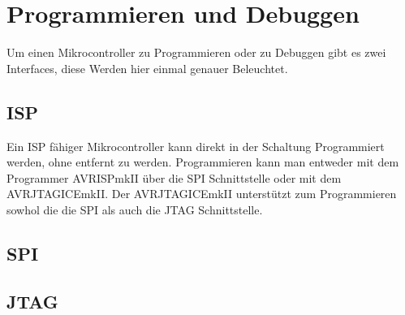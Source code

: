 \chapter{Programmieren und Debuggen}

Um einen Mikrocontroller zu Programmieren oder zu Debuggen gibt es zwei
Interfaces, diese Werden hier einmal genauer Beleuchtet.

\section{ISP}

Ein \ac{ISP} fähiger Mikrocontroller kann direkt in der Schaltung Programmiert
werden, ohne entfernt zu werden. Programmieren kann man entweder mit dem
Programmer AVRISPmkII über die \acs{SPI} Schnittstelle oder mit dem  
AVRJTAGICEmkII. Der AVRJTAGICEmkII unterstützt zum Programmieren sowhol die
die \acs{SPI} als auch die \acs{JTAG} Schnittstelle.


\section{SPI}



\section{JTAG}

